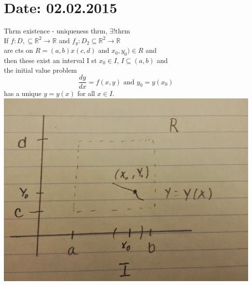 \documentclass[10pt,a4paper]{article}
\begin{document}
\newpage
{}
\section{Date: 02.02.2015}
  Thrm  existence - uniqueness thrm, \( \exists \text{!thrm} \)  \\	
  If \( f: D, \subseteq \mathbb{R}^2 \to  \mathbb{R} \) and \( f_y : D_2
  \subseteq \mathbb{R}^2 \to \mathbb{R}\) \\
  are cts on \( R = (a, b) x (c, d) \) and \( x_0, y_0) \in R\) and \\
  then these exist an interval I st \( x_0 \in I\), \( I \subseteq (a,
  b)\) and \\
  the initial value problem
  \[ \frac{dy}{dx} = f(x, y) \text{ and } y_0 = y(x_0)\]
  has a unique \( y = y(x) \) for all \( x \in I\). \\ 

  \includegraphics[scale=.45]{pic1}
  
\end{document}
